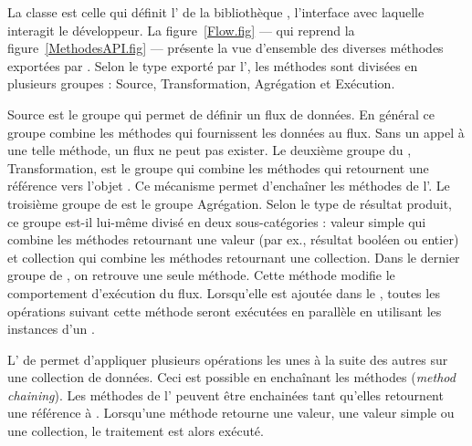 


La classe  est celle qui définit l' de la biblioth\`eque , l'interface avec laquelle interagit le d\'eveloppeur. La figure~\ref{Flow.fig} --- qui reprend la figure~\ref{MethodesAPI.fig} --- pr\'esente la vue d'ensemble des diverses m\'ethodes export\'ees par . Selon le type export\'e par l', les m\'ethodes sont divis\'ees en plusieurs groupes : Source, Transformation, Agr\'egation et Ex\'ecution.

Source est le groupe qui permet de d\'efinir un flux de donn\'ees. En g\'en\'eral ce groupe combine les m\'ethodes qui fournissent les donn\'ees au flux. Sans un appel \`a une telle m\'ethode, un flux ne peut pas exister. Le deuxi\`eme groupe du , Transformation, est le groupe qui combine les m\'ethodes qui retournent une r\'ef\'erence vers l'objet . Ce m\'ecanisme permet d'encha\^iner les m\'ethodes de l'. Le troisi\`eme groupe de  est le groupe Agr\'egation. Selon le type de r\'esultat produit, ce groupe est-il lui-m\^eme divis\'e en deux sous-cat\'egories : valeur simple qui combine les m\'ethodes retournant une valeur (par ex., r\'esultat bool\'een ou entier) et collection qui combine les m\'ethodes retournant une collection. Dans le dernier groupe de  , on retrouve une seule m\'ethode. Cette m\'ethode modifie le comportement d'ex\'ecution du flux. Lorsqu'elle est ajout\'ee dans le  , toutes les op\'erations suivant cette m\'ethode seront ex\'ecut\'ees en parall\`ele en utilisant les instances d'un  .

L' de  permet d'appliquer plusieurs op\'erations les unes à la suite des autres sur une collection de donn\'ees. Ceci est possible en encha\^inant les m\'ethodes (\emph{method chaining}). Les m\'ethodes de l' peuvent \^etre enchain\'ees tant qu'elles retournent une r\'ef\'erence \`a . Lorsqu'une m\'ethode retourne une valeur, une valeur simple ou une collection, le traitement est alors ex\'ecut\'e. 


